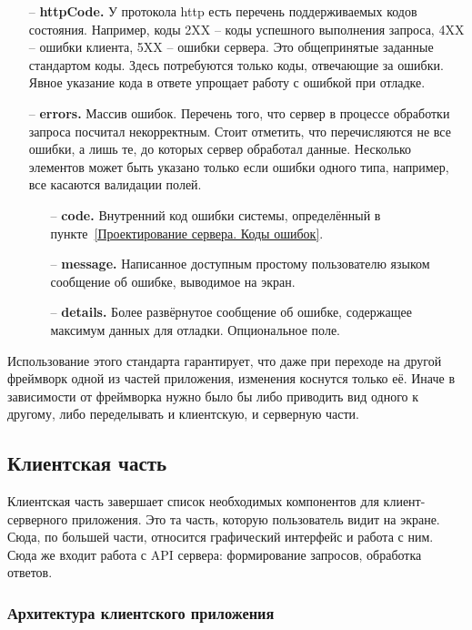 \documentclass[a4paper,article]{article}
\begin{document}
    \begin{itemize}[nolistsep]
        \item[--] \textbf{httpCode.} У протокола http есть перечень поддерживаемых кодов состояния. Например, коды 2XX -- коды успешного выполнения запроса, 4XX -- ошибки клиента, 5XX -- ошибки сервера. Это общепринятые заданные стандартом коды. Здесь потребуются только коды, отвечающие за ошибки. Явное указание кода в ответе упрощает работу с ошибкой при отладке.
        \item[--] \textbf{errors.} Массив ошибок. Перечень того, что сервер в процессе обработки запроса посчитал некорректным. Стоит отметить, что перечисляются не все ошибки, а лишь те, до которых сервер обработал данные. Несколько элементов может быть указано только если ошибки одного типа, например, все касаются валидации полей.
        \begin{itemize}[nolistsep]
            \item[--] \textbf{code.} Внутренний код ошибки системы, определённый в пункте~\ref{Проектирование сервера. Коды ошибок}.
            \item[--] \textbf{message.} Написанное доступным простому пользователю языком сообщение об ошибке, выводимое на экран.
            \item[--] \textbf{details.} Более развёрнутое сообщение об ошибке, содержащее максимум данных для отладки. Опциональное поле.
        \end{itemize}
    \end{itemize}

    Использование этого стандарта гарантирует, что даже при переходе на другой фреймворк одной из частей приложения, изменения коснутся только её. Иначе в зависимости от фреймворка нужно было бы либо приводить вид одного к другому, либо переделывать и клиентскую, и серверную части.

    \newpage

    \subsection{Клиентская часть}

    Клиентская часть завершает список необходимых компонентов для клиент-серверного приложения. Это та часть, которую пользователь видит на экране. Сюда, по большей части, относится графический интерфейс и работа с ним. Сюда же входит работа с API сервера: формирование запросов, обработка ответов.

    \subsubsection{Архитектура клиентского приложения}
\end{document}
